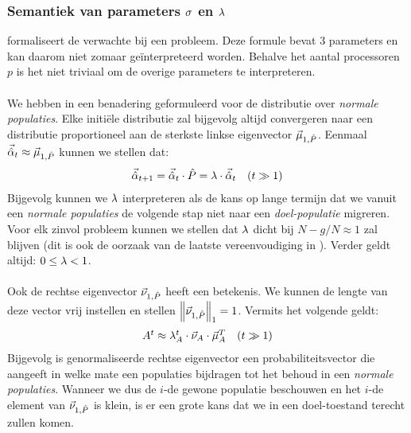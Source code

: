 \subsubsection{Semantiek van parameters $\metapa$ en $\metapb$}

 formaliseert de verwachte \absu{} bij een probleem. Deze formule bevat 3 parameters en kan daarom niet zomaar ge\"interpreteerd worden. Behalve het aantal processoren $p$ is het niet triviaal om de overige parameters te interpreteren.

\paragraph{}
We hebben in  een benadering geformuleerd voor de distributie over \emph{normale populaties}. Elke initi\"ele distributie zal bijgevolg altijd convergeren naar een distributie proportioneel aan de sterkste linkse eigenvector $\evl[1,\removmat]$. Eenmaal $\probdistnormmeta{t}\approx\evl[1,\removmat]$ kunnen we stellen dat:
\begin{equation}
\conditional{\probdistnormmeta{t+1}=\probdistnormmeta{t}\cdot\removmat=\metapb\cdot\probdistnormmeta{t}}{$t\gg 1$}
\end{equation}
Bijgevolg kunnen we $\metapb$ interpreteren als de kans op lange termijn dat we vanuit een \emph{normale populaties} de volgende stap niet naar een \emph{doel-populatie} migreren. Voor elk zinvol probleem kunnen we stellen dat $\metapb$ dicht bij $N-g/N\approx 1$ zal blijven (dit is ook de oorzaak van de laatste vereenvoudiging in ). Verder geldt altijd: $0\leq\metapb<1$.

\paragraph{}
Ook de rechtse eigenvector $\evr[1,\removmat]$ heeft een betekenis. We kunnen de lengte van deze vector vrij instellen en stellen $\dabs[1]{\evr[1,\removmat]}=1$. Vermits het volgende geldt:
\begin{equation}
\conditional{A^t\approx\ev[A]^t\cdot\evr[A]\cdot\evl[A]^T}{$t\gg1$}
\end{equation}
Bijgevolg is genormaliseerde rechtse eigenvector een probabiliteitsvector die aangeeft in welke mate een populaties bijdragen tot het behoud in een \emph{normale populaties}. Wanneer we dus de $i$-de gewone populatie beschouwen en het $i$-de element van $\evr[1,\removmat]$ is klein, is er een grote kans dat we in een doel-toestand terecht zullen komen.

